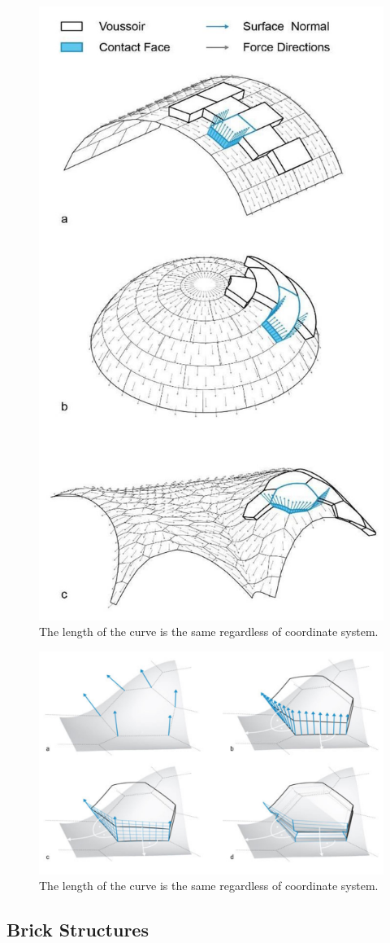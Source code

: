 \begin{figure}[H]
\centering
\includegraphics[width=0.50\linewidth ]{figure/Introduction/StereoBlock2.JPG}
\caption{The length of the curve is the same regardless of coordinate system.}
\end{figure}

\begin{figure}[H]
\centering
\includegraphics[height=0.4\linewidth ]{figure/Introduction/StereoBlock.JPG}
\caption{The length of the curve is the same regardless of coordinate system.}
\end{figure}




  

\subsection{Brick Structures}

